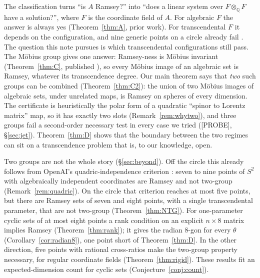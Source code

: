 \documentclass[11pt]{amsart}
\newcommand{\st}[1]{\textsf{[#1]}}
\newcommand{\Q}{\mathbb{Q}}
\theoremstyle{plain}
\theoremstyle{definition}
\begin{document}
The classification turns ``is $A$ Ramsey?'' into ``does a linear system over $F\otimes_\Q F$ have a
solution?'', where $F$ is the coordinate field of $A$. For algebraic $F$ the answer is always yes
(Theorem~\ref{thm:A}, prior work). For transcendental $F$ it depends on the configuration, and
nine generic points on a circle already fail \cite[Prop.~7.6]{OAI172}. The question this note
pursues is which transcendental configurations still pass. The M\"obius group gives one answer:
Ramsey-ness is M\"obius invariant (Theorem~\ref{thm:C}, published \cite{MR}), so every M\"obius
image of an algebraic set is Ramsey, whatever its transcendence degree. Our main theorem says that
\emph{two} such groups can be combined (Theorem~\ref{thm:C2}): the union of two M\"obius images of
algebraic sets, under unrelated maps, is Ramsey on spheres of every dimension. The certificate is
heuristically the polar form of a quadratic ``spinor to Lorentz matrix'' map, so it has exactly two
slots (Remark~\ref{rem:whytwo}), and three groups fail a second-order necessary test in every case we tried (\st{PROBE},
\S\ref{sec:jet}). Theorem~\ref{thm:D} shows that the boundary between the two regimes can sit on
a transcendence problem that is, to our knowledge, open.

Two groups are not the whole story (\S\ref{sec:beyond}). Off the circle this already follows from
OpenAI's quadric-independence criterion \cite[Prop.~7.3]{OAI172}: seven to nine points of $S^2$ with
algebraically independent coordinates are Ramsey and not two-group (Remark~\ref{rem:quadric}). On the
circle that criterion reaches at most five points, but there are Ramsey sets of
seven and eight points, with a single transcendental parameter, that are not two-group
(Theorem~\ref{thm:NTG}). For one-parameter cyclic sets of at most eight points a rank condition on
an explicit $n\times8$ matrix implies Ramsey (Theorem~\ref{thm:rank}); it gives the radian
$8$-gon for every $\theta$ (Corollary~\ref{cor:radian8}), one point short of Theorem~\ref{thm:D}.
In the other direction, five points with rational cross-ratios make the two-group property
necessary, for regular coordinate fields (Theorem~\ref{thm:rigid}). These results fit an
expected-dimension count for cyclic sets (Conjecture~\ref{conj:count}).
\end{document}
